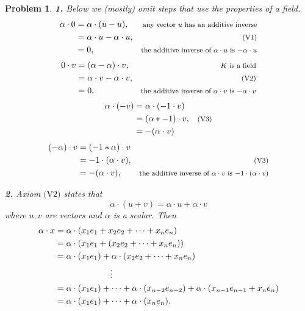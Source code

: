 \documentclass{article}
\theoremstyle{pprop}
\newtheorem{problem}{Problem}[section]
\begin{document}
\begin{problem}
\noindent\textbf{1.} Below we (mostly) omit steps that use the properties of a field. 
\begin{align*}
\alpha\cdot 0&=\alpha\cdot(u-u), & \text{\footnotesize any vector $u$ has an additive inverse} \\
&=\alpha \cdot u - \alpha \cdot u, & \text{\footnotesize (V1)} \\
& =0, & \text{\footnotesize the additive inverse of $\alpha \cdot u$ is $-\alpha \cdot u$}
\end{align*}   
\begin{align*}
0 \cdot v &= (\alpha - \alpha) \cdot v, & \text{\footnotesize$K$ is a field} \\
& = \alpha \cdot v - \alpha \cdot v, & \text{\footnotesize (V2)} \\
& =0, & \text{\footnotesize the additive inverse of $\alpha \cdot v$ is $-\alpha \cdot v$}
\end{align*}
\begin{align*}
\alpha \cdot (-v) & = \alpha \cdot (-1 \cdot v) & \\
& = (\alpha * -1) \cdot v, & \text{\footnotesize (V3)} \\
& = - (\alpha \cdot v)  & 
\end{align*}
\begin{align*}
(-\alpha) \cdot v & = (-1 *\alpha) \cdot v & \\
& = -1\cdot (\alpha\cdot v), & \text{\footnotesize (V3)} \\
& = - (\alpha \cdot v), & \text{\footnotesize the additive inverse of $\alpha \cdot v$ is $-1\cdot(\alpha \cdot v)$} 
\end{align*}
\par\noindent\textbf{2.} Axiom $\text{(V2)}$ states that 
$$
\alpha\cdot(u+v)=\alpha\cdot u + \alpha \cdot v
$$
where $u,v$ are vectors and $\alpha$ is a scalar. Then 
\begin{align*}
\alpha \cdot x &= \alpha \cdot (x_1 e_1 + x_2 e_2 + \cdots + x_n e_n) \\
& = \alpha \cdot (x_1 e_1 + ( x_2 e_2 + \cdots + x_n e_n)) \\
& = \alpha \cdot (x_1 e_1)+ \alpha \cdot (x_2 e_2 + \cdots + x_n e_n) \\
& \kern15ex \vdots \\
& = \alpha \cdot (x_1 e_1)+\cdots + \alpha \cdot (x_{n-2} e_{n-2})+
\alpha \cdot(x_{n-1}e_{n-1}+ x_n e_n) \\
& = \alpha\cdot (x_1 e_1)+ \cdots + \alpha\cdot(x_n e_n).

\end{align*}
\end{problem}
\end{document}
